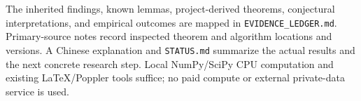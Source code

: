 \documentclass[11pt]{article}
\theoremstyle{remark}\newtheorem{remark}[theorem]{Remark}
\begin{document}
The inherited findings, known lemmas, project-derived theorems, conjectural
interpretations, and empirical outcomes are mapped in
\texttt{EVIDENCE\_LEDGER.md}. Primary-source notes record inspected theorem
and algorithm locations and versions. A Chinese explanation and
\texttt{STATUS.md} summarize the actual results and the next concrete
research step. Local NumPy/SciPy CPU computation and existing LaTeX/Poppler
tools suffice; no paid compute or external private-data service is used.

\appendix

\clearpage


\end{document}
